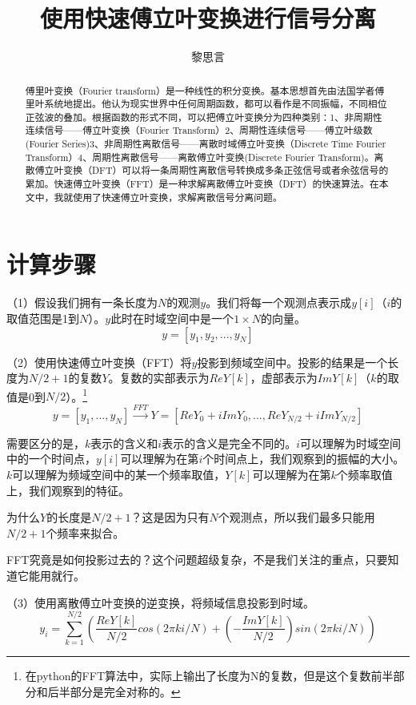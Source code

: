 \documentclass[12pt,a4paper,onecolumn]{article}
\title{使用快速傅立叶变换进行信号分离}
\date{}
\author{黎思言}
\begin{document}
\renewcommand{\abstractname}{}
\maketitle

\begin{abstract}
	傅里叶变换（Fourier transform）是一种线性的积分变换。基本思想首先由法国学者傅里叶系统地提出。他认为现实世界中任何周期函数，都可以看作是不同振幅，不同相位正弦波的叠加。根据函数的形式不同，可以把傅立叶变换分为四种类别：1、非周期性连续信号——傅立叶变换（Fourier Transform）2、周期性连续信号——傅立叶级数(Fourier Series)3、非周期性离散信号——离散时域傅立叶变换（Discrete Time Fourier Transform）4、周期性离散信号——离散傅立叶变换(Discrete Fourier Transform)。离散傅立叶变换（DFT）可以将一条周期性离散信号转换成多条正弦信号或者余弦信号的累加。快速傅立叶变换（FFT）是一种求解离散傅立叶变换（DFT）的快速算法。在本文中，我就使用了快速傅立叶变换，求解离散信号分离问题。
\end{abstract}

\section{计算步骤}

（1）假设我们拥有一条长度为$N$的观测$y$。我们将每一个观测点表示成$y[i]$（$i$的取值范围是1到$N$）。$y$此时在时域空间中是一个$1\times N$的向量。
$$y=[y_1,y_2,...,y_N]$$

（2）使用快速傅立叶变换（FFT）将$y$投影到频域空间中。投影的结果是一个长度为$N/2+1$的复数$Y$。复数的实部表示为$ReY[k]$，虚部表示为$ImY[k]$（$k$的取值是0到$N/2$）。\footnote{在python的FFT算法中，实际上输出了长度为N的复数，但是这个复数前半部分和后半部分是完全对称的。}
$$y=[y_1,...,y_N]\xrightarrow{FFT} Y=[ReY_0+iImY_0,...,ReY_{N/2}+iImY_{N/2}]$$

需要区分的是，$k$表示的含义和$i$表示的含义是完全不同的。$i$可以理解为时域空间中的一个时间点，$y[i]$可以理解为在第$i$个时间点上，我们观察到的振幅的大小。$k$可以理解为频域空间中的某一个频率取值，$Y[k]$可以理解为在第$k$个频率取值上，我们观察到的特征。

为什么$Y$的长度是$N/2+1$？这是因为只有$N$个观测点，所以我们最多只能用$N/2+1$个频率来拟合。

FFT究竟是如何投影过去的？这个问题超级复杂，不是我们关注的重点，只要知道它能用就行。

（3）使用离散傅立叶变换的逆变换，将频域信息投影到时域。
$$y_i=\sum_{k=1}^{N/2}(\frac{ReY[k]}{N/2}cos(2\pi ki/N)+(-\frac{ImY[k]}{N/2})sin(2\pi ki/N))$$
\end{document}
